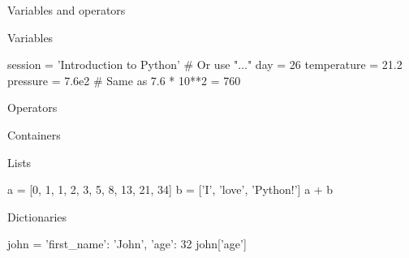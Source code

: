 \begin{frame}[fragile]{Variables and operators}
    \vspace{0.5em}
    \begin{block}{Variables}
        \begin{py3}
            session = 'Introduction to Python'  # Or use "..."
            day = 26
            temperature = 21.2
            pressure = 7.6e2  # Same as 7.6 * 10**2 = 760
        \end{py3}
    \end{block}
    \vspace{-0.75em}
    \begin{block}{Operators}
    \end{block}
\end{frame}

\begin{frame}[fragile]{Containers}
    \vspace{0.5em}
    \begin{block}{Lists}
        \begin{py3}
            a = [0, 1, 1, 2, 3, 5, 8, 13, 21, 34]
            b = ['I', 'love', 'Python!']
            a + b
        \end{py3}
    \end{block}
    \vspace{-0.75em}
    \begin{block}{Dictionaries}
        \begin{py3}
            john = {
                'first_name': 'John',
                'age': 32
            }
            john['age']
        \end{py3}
    \end{block}
\end{frame}

